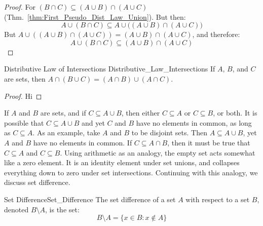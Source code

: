             \begin{proof}
                For $(B\cap{C})\subseteq(A\cup{B})\cap(A\cup{C})$
                (Thm.~\ref{thm:First_Pseudo_Dist_Law_Union}).
                But then:
                \begin{equation}
                    A\cup(B\cap{C})\subseteq
                    A\cup\Big((A\cup{B})\cap(A\cup{C})\Big)
                \end{equation}
                But $A\cup((A\cup{B})\cap(A\cup{C}))%
                     =(A\cup{B})\cap(A\cup{C})$, and therefore:
                \begin{equation}
                    A\cup(B\cap{C})\subseteq
                    (A\cup{B})\cap(A\cup{C})
                \end{equation}
            \end{proof}
            \begin{ltheorem}{Distributive Law of Intersections}
                  {Distributive_Law_Intersections}
                If $A$, $B$, and $C$ are sets, then
                $A\cap(B\cup{C})=(A\cap{B})\cup(A\cap{C})$.
            \end{ltheorem}
            \begin{proof}
                Hi
            \end{proof}
            If $A$ and $B$ are sets, and if
            $C\subseteq{A}\cup{B}$, then
            either $C\subseteq{A}$ or $C\subseteq{B}$, or both.
            It is possible that $C\subseteq{A}\cup{B}$ and yet
            $C$ and $B$ have no elements in common, as long
            as $C\subseteq{A}$. As an example,
            take $A$ and $B$ to be disjoint sets. Then
            $A\subseteq{A}\cup{B}$, yet $A$ and $B$ have no
            elements in common. If $C\subseteq{A}\cap{B}$, then
            it must be true that $C\subseteq{A}$ and
            $C\subseteq{B}$.
            Using arithmetic as an analogy, the empty set
            acts somewhat like a zero element. It is an identity
            element under set unions, and collapses everything
            down to zero under set intersections. Continuing
            with this analogy, we discuss set difference.
            \begin{ldefinition}{Set Difference}{Set_Difference}
                The set difference of a set $A$ with respect to
                a set $B$, denoted $B\setminus{A}$, is the set:
                \begin{equation}
                    B\setminus{A}=\{x\in{B}:x\notin{A}\}
                \end{equation}
            \end{ldefinition}
